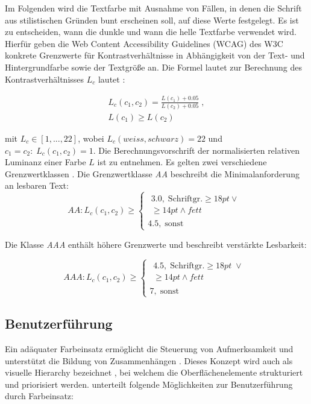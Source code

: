 Im Folgenden wird die Textfarbe mit Ausnahme von Fällen, in denen die Schrift aus stilistischen Gründen bunt erscheinen soll, auf diese Werte festgelegt. Es ist zu entscheiden, wann die dunkle und wann die helle Textfarbe verwendet wird. Hierfür geben die Web Content Accessibility Guidelines (WCAG) des W3C konkrete Grenzwerte für Kontrastverhältnisse in Abhängigkeit von der Text- und Hintergrundfarbe sowie der Textgröße an. Die Formel lautet zur Berechnung des Kontrastverhältnisses $L_c$ lautet \citep{wcag-contrast}:

\begin{equation}
	\begin{split}
		L_c(c_1, c_2) = \frac{L(c_1) + 0.05}{L(c_2) + 0.05} \;,\\ L(c_1) \geq L(c_2)
	\end{split}
\end{equation}

mit $L_c \in [1, ... , 22]$, wobei $L_c(weiss, schwarz) = 22$ und $c_1 = c_2: \;L_c(c_1, c_2) = 1$. Die Berechnungsvorschrift der normalisierten relativen Luminanz einer Farbe $L$ ist \citep{wcag-rel-luminance} zu entnehmen.
Es gelten zwei verschiedene Grenzwertklassen \citep{wcag}. Die Grenzwertklasse \emph{AA} beschreibt die Minimalanforderung an lesbaren Text:
\begin{equation}
  	AA: L_c(c_1, c_2) \geq
	\begin{cases}
		\begin{split}3.0, \; \text{Schriftgr.} \geq 18pt \lor \\ \geq 14pt \land fett\end{split} \\
		4.5,  \;  \text{sonst}
	\end{cases}
\end{equation}

Die Klasse \emph{AAA} enthält höhere Grenzwerte und beschreibt verstärkte Lesbarkeit:

\begin{equation}
  	AAA: L_c(c_1, c_2) \geq
	\begin{cases}
		\begin{split}4.5, \; \text{Schriftgr.} \geq 18pt \; \lor \\ \geq 14pt \land fett\end{split} \\
		7,  \;  \text{sonst}
	\end{cases}
\end{equation}

\subsection{Benutzerführung}
\label{sec:usability}
Ein adäquater Farbeinsatz ermöglicht die Steuerung von Aufmerksamkeit und unterstützt die Bildung von Zusammenhängen \citep{webdesign}.  Dieses Konzept wird auch als visuelle Hierarchy bezeichnet \citep{visual-hierarchy}, bei welchem die Oberflächenelemente strukturiert und priorisiert werden.
\citet{webdesign} unterteilt folgende Möglichkeiten zur Benutzerführung durch Farbeinsatz:

